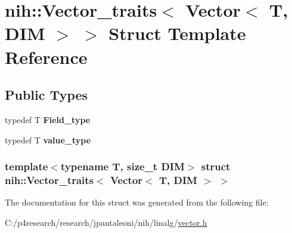 \hypertarget{structnih_1_1_vector__traits_3_01_vector_3_01_t_00_01_d_i_m_01_4_01_4}{
\section{nih\-:\-:\-Vector\-\_\-traits$<$ \-Vector$<$ \-T, \-D\-I\-M $>$ $>$ \-Struct \-Template \-Reference}
\label{structnih_1_1_vector__traits_3_01_vector_3_01_t_00_01_d_i_m_01_4_01_4}
}
\subsection*{\-Public \-Types}
\begin{DoxyCompactItemize}
\item 
\hypertarget{structnih_1_1_vector__traits_3_01_vector_3_01_t_00_01_d_i_m_01_4_01_4_ad1379239123330d411ccde9bdde8b38a}{
typedef \-T {\bfseries \-Field\-\_\-type}}
\label{structnih_1_1_vector__traits_3_01_vector_3_01_t_00_01_d_i_m_01_4_01_4_ad1379239123330d411ccde9bdde8b38a}

\item 
\hypertarget{structnih_1_1_vector__traits_3_01_vector_3_01_t_00_01_d_i_m_01_4_01_4_a865a405f54f6c88d42a8cad4b2f7a1f3}{
typedef \-T {\bfseries value\-\_\-type}}
\label{structnih_1_1_vector__traits_3_01_vector_3_01_t_00_01_d_i_m_01_4_01_4_a865a405f54f6c88d42a8cad4b2f7a1f3}

\end{DoxyCompactItemize}
\subsubsection*{template$<$typename T, size\-\_\-t \-D\-I\-M$>$ struct nih\-::\-Vector\-\_\-traits$<$ Vector$<$ T, D\-I\-M $>$ $>$}



\-The documentation for this struct was generated from the following file\-:\begin{DoxyCompactItemize}
\item 
\-C\-:/p4research/research/jpantaleoni/nih/linalg/\hyperlink{vector_8h}{vector.\-h}\end{DoxyCompactItemize}
